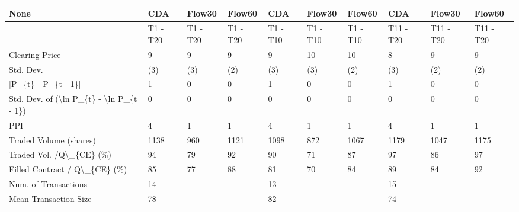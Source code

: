 \begin{tabular}{llllllllll}
\hline
 None                                                      & CDA      & Flow30   & Flow60   & CDA      & Flow30   & Flow60   & CDA       & Flow30    & Flow60    \\
\hline
                                                           & T1 - T20 & T1 - T20 & T1 - T20 & T1 - T10 & T1 - T10 & T1 - T10 & T11 - T20 & T11 - T20 & T11 - T20 \\
 Clearing Price                                            & 9        & 9        & 9        & 9        & 10       & 10       & 8         & 9         & 9         \\
 Std. Dev.                                                 & (3)      & (3)      & (2)      & (3)      & (3)      & (2)      & (3)       & (2)       & (2)       \\
 |P\_\{t\} - P\_\{t - 1\}|                                       & 1        & 0        & 0        & 1        & 0        & 0        & 1         & 0         & 0         \\
 Std. Dev. of (\textbackslash{}ln P\_\{t\} - \textbackslash{}ln P\_\{t - 1\})                  & 0        & 0        & 0        & 0        & 0        & 0        & 0         & 0         & 0         \\
 PPI                                                       & 4        & 1        & 1        & 4        & 1        & 1        & 4         & 1         & 1         \\
 Traded Volume (shares)                                    & 1138     & 960      & 1121     & 1098     & 872      & 1067     & 1179      & 1047      & 1175      \\
 Traded Vol. /Q\textbackslash{}\_\{CE\} (\%)                                  & 94       & 79       & 92       & 90       & 71       & 87       & 97        & 86        & 97        \\
 Filled Contract / Q\textbackslash{}\_\{CE\} (\%)                             & 85       & 77       & 88       & 81       & 70       & 84       & 89        & 84        & 92        \\
 Num. of Transactions                                      & 14       &          &          & 13       &          &          & 15        &           &           \\
 Mean Transaction Size                                     & 78       &          &          & 82       &          &          & 74        &           &           \\

\end{tabular}
